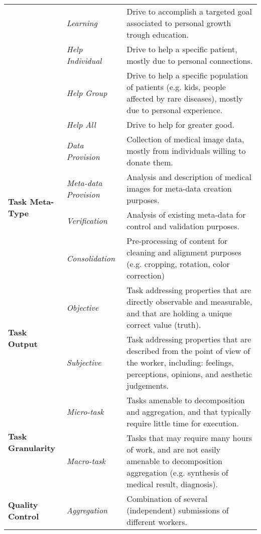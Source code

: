 \documentclass[10pt,twocolumn,letterpaper]{article}
\begin{document}
\begin{table*}
\begin{tabular}{lm{75px}m{320px}}
									 	& \textit{Learning} &  Drive to accomplish a targeted goal associated to personal growth trough education. \\ \cline{2-3}		
									 	& \textit{Help Individual} & Drive to help a specific patient, mostly due to personal connections. \\\cline{2-3}									
										& \textit{Help Group} & Drive to help a specific population of patients (e.g. kids, people affected by rare diseases), mostly due to personal experience. \\ \cline{2-3}									
									 	& \textit{Help All} & Drive to help for greater good.   \\
		\midrule		 
		\multirow{4}{*}{\textbf{Task Meta-Type}}	& \textit{Data Provision} & Collection of medical image data, mostly from individuals willing to donate them.\\ \cline{2-3}
									 	& \textit{Meta-data Provision} & Analysis and description of medical images for meta-data creation purposes. \\	\cline{2-3}
									 	& \textit{Verification} & Analysis of existing meta-data for control and validation purposes. \\	\cline{2-3}									
									 	& \textit{Consolidation} & Pre-processing of content for cleaning and alignment purposes (e.g. cropping, rotation, color correction)  \\
		\midrule		 
		\multirow{2}{*}{\textbf{Task Output}}		& \textit{Objective} & Task addressing properties that are directly observable and measurable, and that are holding a unique correct value (truth). \\ \cline{2-3}
									 	& \textit{Subjective} & Task addressing properties that are described from the point of view of the worker, including: feelings, perceptions, opinions, and aesthetic judgements. \\	
		\midrule		 
		\multirow{2}{*}{\textbf{Task Granularity}}	& \textit{Micro-task} & Tasks amenable to decomposition and aggregation, and that typically require little time for execution.\\ \cline{2-3}
									 	& \textit{Macro-task} & Tasks that may require many hours of work, and are not easily amenable to decomposition aggregation (e.g. synthesis of medical result, diagnosis). \\											
		\midrule	
		\multirow{7}{*}{\textbf{Quality Control}}	& \textit{Aggregation} & Combination of several (independent) submissions of different workers. \\ \cline{2-3}

\end{tabular}
\end{table*}
\end{document}
